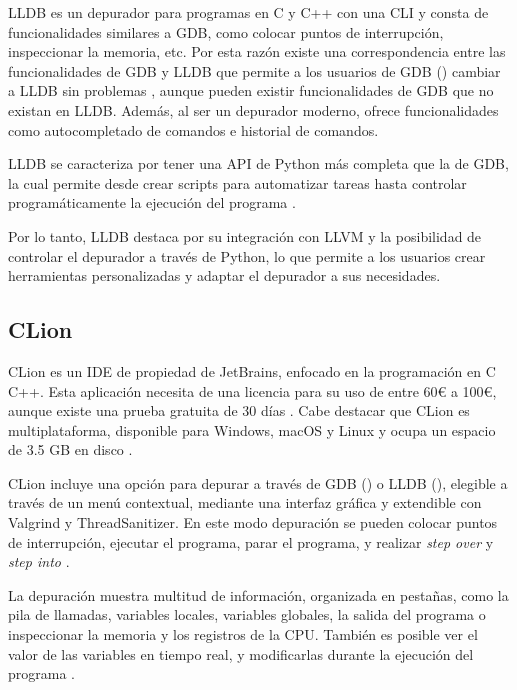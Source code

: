 \gls{LLDB} es un depurador para programas en \gls{C} y \gls{C++} con una \gls{CLI} y consta de funcionalidades similares a \gls{GDB}, como colocar puntos de interrupción, inspeccionar la memoria, etc. Por esta razón existe una correspondencia entre las funcionalidades de \gls{GDB} y \gls{LLDB} que permite a los usuarios de \gls{GDB} () cambiar a \gls{LLDB} sin problemas \cite{LLDB}, aunque pueden existir funcionalidades de \gls{GDB} que no existan en \gls{LLDB}. Además, al ser un depurador moderno, ofrece funcionalidades como autocompletado de comandos e historial de comandos.

\gls{LLDB} se caracteriza por tener una \gls{API} de \gls{Python} más completa que la de \gls{GDB}, la cual permite desde crear \glspl{script} para automatizar tareas hasta controlar programáticamente la ejecución del programa \cite{LLDBPython}. 

Por lo tanto, \gls{LLDB} destaca por su integración con \gls{LLVM} y la posibilidad de controlar el depurador a través de \gls{Python}, lo que permite a los usuarios crear herramientas personalizadas y adaptar el depurador a sus necesidades.


\subsection{CLion}{\label{subsec:clion}}
\gls{CLion} es un \gls{IDE} de propiedad de JetBrains, enfocado en la programación en \gls{C} \gls{C++}. Esta aplicación necesita de una licencia para su uso de entre 60€ a 100€, aunque existe una prueba gratuita de 30 días \cite{ClionPrizing}. Cabe destacar que \gls{CLion} es multiplataforma, disponible para Windows, macOS y Linux y ocupa un espacio de 3.5 GB en disco \cite{ClionDownload}.

\gls{CLion} incluye una opción para depurar a través de \gls{GDB} () o LLDB (), elegible a través de un menú contextual, mediante una \gls{interfaz gráfica} y extendible con \gls{Valgrind} y \gls{ThreadSanitizer}. En este modo depuración se pueden colocar puntos de interrupción, ejecutar el programa, parar el programa, y realizar \textit{\gls{step over}} y \textit{\gls{step into}} \cite{ClionDebugger}.

La depuración muestra multitud de información, organizada en pestañas, como la pila de llamadas, variables locales, variables globales, la salida del programa o inspeccionar la memoria y los registros de la \gls{CPU}. También es posible ver el valor de las variables en tiempo real, y modificarlas durante la ejecución del programa \cite{ClionDebuggerToolWindow}.

